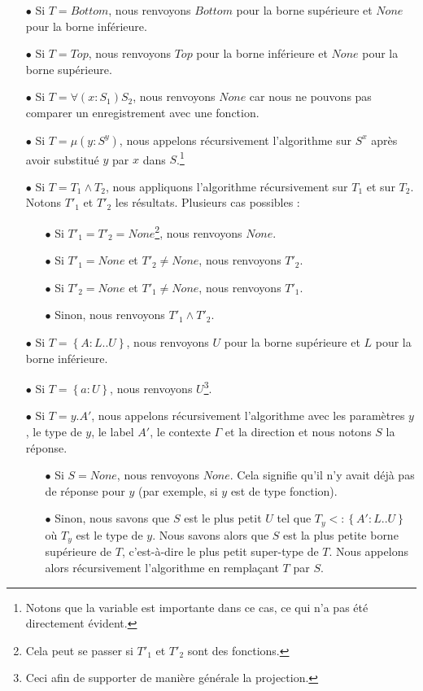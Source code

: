 \begin{itemize}
\item[$\bullet$] Si $T = Bottom$, nous renvoyons $Bottom$ pour la borne supérieure et
  $None$ pour la borne inférieure.
\item[$\bullet$] Si $T = Top$, nous renvoyons $Top$ pour la borne inférieure et
  $None$ pour la borne supérieure.
\item[$\bullet$] Si $T = \forall(x : S_{1}) S_{2}$, nous renvoyons $None$ car nous
  ne pouvons pas comparer un enregistrement avec une fonction.
\item[$\bullet$] Si $T = \mu(y : S^{y})$, nous appelons récursivement l'algorithme sur
  $S^{x}$ après avoir substitué $y$ par $x$ dans $S$.\footnote{Notons que la
    variable est importante dans ce cas, ce qui n'a pas été directement
    évident.}
\item[$\bullet$] Si $T = T_{1} \wedge T_{2}$, nous
  appliquons l'algorithme récursivement sur $T_{1}$ et sur $T_{2}$. Notons
  $T'_{1}$ et $T'_{2}$ les résultats. Plusieurs cas possibles :
  \begin{itemize}
  \item[$\bullet$] Si $T'_{1} = T'_{2} = None$\footnote{Cela peut se
    passer si $T'_{1}$ et $T'_{2}$ sont des fonctions.}, nous renvoyons $None$.
  \item[$\bullet$] Si $T'_{1} = None$ et $T'_{2} \neq None$, nous renvoyons $T'_{2}$.
  \item[$\bullet$] Si $T'_{2} = None$ et $T'_{1} \neq None$, nous renvoyons $T'_{1}$.
  \item[$\bullet$] Sinon, nous renvoyons $T'_{1} \wedge T'_{2}$.
  \end{itemize}
\item[$\bullet$] Si $T = \left\{ A : L .. U \right\}$, nous renvoyons $U$ pour la borne
  supérieure et $L$ pour la borne inférieure.
\item[$\bullet$] Si $T = \left\{ a : U \right\}$, nous renvoyons $U$\footnote{Ceci afin de
    supporter de manière générale la projection.}.
\item[$\bullet$] Si $T = y.A'$, nous appelons récursivement l'algorithme avec les paramètres
  $y$, le type de $y$, le label $A'$, le contexte $\Gamma$ et la direction et
  nous notons $S$ la réponse.
  \begin{itemize}
  \item[$\bullet$] Si $S = None$, nous renvoyons $None$. Cela signifie qu'il n'y avait déjà
  pas de réponse pour $y$ (par exemple, si $y$ est de type fonction).
  \item[$\bullet$] Sinon, nous savons que $S$ est le plus petit $U$ tel que $T_{y} <:
    \left\{ A' 
    : L .. U \right\}$ où $T_{y}$ est le type de $y$. Nous savons alors que $S$
  est la plus petite borne supérieure de $T$, c'est-à-dire le plus petit super-type de $T$. Nous
  appelons alors récursivement l'algorithme en remplaçant $T$ par $S$.
  \end{itemize}
\end{itemize}

